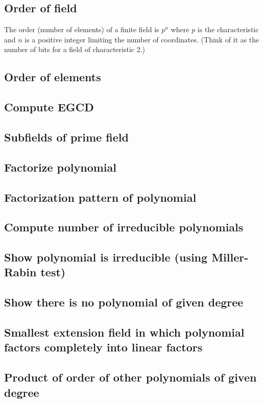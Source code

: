 \documentclass{article}
\begin{document}
\subsection{Order of field}
The order (number of elements) of a finite field is $p^n$ where $p$ is the characteristic and $n$ is a positive integer limiting the number of coordinates. (Think of it as the number of bits for a field of characteristic 2.)

\subsection{Order of elements}

\subsection{Compute EGCD}
\subsection{Subfields of prime field}
\subsection{Factorize polynomial}
\subsection{Factorization pattern of polynomial}
\subsection{Compute number of irreducible polynomials}
\subsection{Show polynomial is irreducible (using Miller-Rabin test)}


\subsection{Show there is no polynomial of given degree}
\subsection{Smallest extension field in which polynomial factors completely into linear factors}
\subsection{Product of order of other polynomials of given degree}
\end{document}
